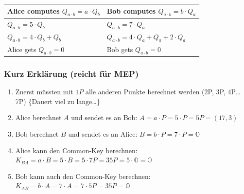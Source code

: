 \documentclass[11pt]{article}
\begin{document}
\begin{longtable}[]{@{}ll@{}}
\toprule
\begin{minipage}[b]{0.39\columnwidth}\raggedright
Alice computes \(Q_{a\cdot b} = a\cdot Q_b\)\strut
\end{minipage} & \begin{minipage}[b]{0.55\columnwidth}\raggedright
Bob computes \(Q_{a\cdot b} = b\cdot Q_a\)\strut
\end{minipage}\tabularnewline
\midrule
\endhead
\begin{minipage}[t]{0.39\columnwidth}\raggedright
\(Q_{a\cdot b} = 5\cdot Q_b\)\strut
\end{minipage} & \begin{minipage}[t]{0.55\columnwidth}\raggedright
\(Q_{a\cdot b} = 7\cdot Q_a\)\strut
\end{minipage}\tabularnewline
\begin{minipage}[t]{0.39\columnwidth}\raggedright
\(Q_{a\cdot b} = 4\cdot Q_b+Q_b\)\strut
\end{minipage} & \begin{minipage}[t]{0.55\columnwidth}\raggedright
\(Q_{a\cdot b} = 4\cdot Q_a+Q_a+2\cdot Q_a\)\strut
\end{minipage}\tabularnewline
\begin{minipage}[t]{0.39\columnwidth}\raggedright
Alice gets \(Q_{a\cdot b} = 0\)\strut
\end{minipage} & \begin{minipage}[t]{0.55\columnwidth}\raggedright
Bob gets \(Q_{a\cdot b} =0\)\strut
\end{minipage}\tabularnewline
\bottomrule
\end{longtable}

\hypertarget{kurz-erkluxe4rung-reicht-fuxfcr-mep}{%
\subsubsection{Kurz Erklärung (reicht für
MEP)}\label{kurz-erkluxe4rung-reicht-fuxfcr-mep}}

\begin{enumerate}
\def\labelenumi{\arabic{enumi}.}
\item
  Zuerst müssten mit \(1P\) alle anderen Punkte berechnet werden (2P,
  3P, 4P\ldots{} 7P) \{Dauert viel zu lange\ldots{}\}
\item
  Alice berechnet \(A\) und sendet es an Bob:
  \(A = a \cdot P = 5 \cdot P = 5P = (17,3)\)
\item
  Bob berechnet \(B\) und sendet es an Alice:
  \(B = b \cdot P = 7 \cdot P = \mathbb{O}\)
\item
  Alice kann den Common-Key berechnen:
  \(K_{BA} = a \cdot B = 5 \cdot B = 5 \cdot 7P = 35P = 5 \cdot \mathbb{O} = \mathbb{O}\)
\item
  Bob kann auch den Common-Key berechnen:
  \(K_{AB} = b \cdot A = 7 \cdot A = 7 \cdot 5P = 35P = \mathbb{O}\)
\end{enumerate}
\end{document}
